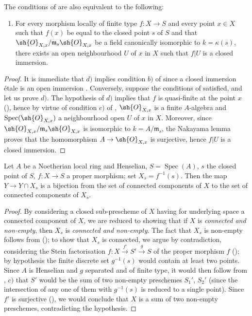 \begin{remark}[18.5.18]
\label{IV.18.5.18}
The conditions of  are also equivalent to the following:
\begin{enumerate}
  \item[d)] For every morphism locally of finite type $f:X\to S$ and every point $x\in X$ such that $f(x)$ be equal to the closed point $s$ of $S$ and that $\sh{O}_{X,x}/\mathfrak{m}_s\sh{O}_{X,x}$ be a field canonically isomorphic to $k=\kappa(s)$, there exists an open neighbourhood $U$ of $x$ in $X$ such that $f|U$ is a closed immersion.
\end{enumerate}
\end{remark}

\begin{proof}
It is immediate that $d)$ implies condition $b)$ of  since a closed immersion \'etale is an open immersion .
Conversely, suppose the conditions of  satisfied, and let us prove $d)$.
The hypothesis of $d)$ implies that $f$ is quasi-finite at the point $x$ (), hence by virtue of condition $c)$ of , $\sh{O}_{X,x}$ is a finite $A$-algebra and $\operatorname{Spec}(\sh{O}_{X,x})$ a neighbourhood open $U$ of $x$ in $X$.
Moreover, since $\sh{O}_{X,x}/\mathfrak{m}_s\sh{O}_{X,x}$ is isomorphic to $k=A/\mathfrak{m}_s$, the Nakayama lemma proves that the homomorphism $A\to\sh{O}_{X,x}$ is surjective, hence $f|U$ is a closed immersion.
\end{proof}

\begin{proposition}[18.5.19]
\label{IV.18.5.19}
Let $A$ be a Noetherian local ring and Henselian, $S=\operatorname{Spec}(A)$, $s$ the closed point of $S$, $f:X\to S$ a proper morphism;
set $X_s=f^{-1}(s)$.
Then the map $Y\to Y\cap X_s$ is a bijection from the set of connected components of $X$ to the set of connected components of $X_s$.
\end{proposition}

\begin{proof}
By considering a closed sub-prescheme of $X$ having for underlying space a connected component of $X$, we are reduced to showing that if $X$ is \emph{connected and non-empty}, then $X_s$ is \emph{connected and non-empty}.
The fact that $X_s$ is non-empty follows from ();
to show that $X_s$ is connected, we argue by contradiction, considering the Stein factorisation $f:X\xrightarrow{f'}S'\xrightarrow{g}S$ of the proper morphism $f$ ();
by hypothesis the finite discrete set $g^{-1}(s)$ would contain at least two points.
Since $A$ is Henselian and $g$ separated and of finite type, it would then follow from , $c)$ that $S'$ would be the sum of two non-empty preschemes $S_1'$, $S_2'$ (since the intersection of any one of them with $g^{-1}(s)$ is reduced to a single point).
Since $f'$ is surjective (), we would conclude that $X$ is a sum of two non-empty preschemes, contradicting the hypothesis.
\end{proof}
